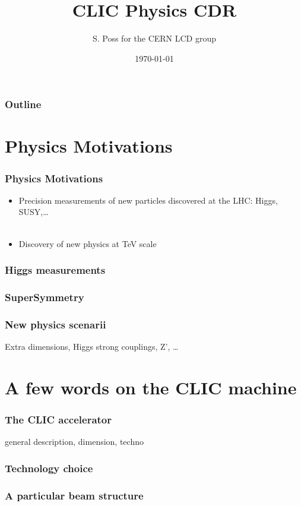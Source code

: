 \documentclass{beamer}
\author{S. Poss for the CERN LCD group}
\institute[CERN]{CERN}
\title[]{CLIC Physics CDR}
\date{\today}
\begin{document}
\begin{frame}
	\titlepage
\end{frame}

\begin{frame}
\frametitle{Outline}
\tableofcontents
\end{frame}


\section{Physics Motivations}
\begin{frame}
\frametitle{Physics Motivations}
\begin{itemize}
  \item \alert{Precision measurements} of new particles discovered at the LHC:
  Higgs, SUSY,\ldots\\
  ~\\ 
  \item \alert{Discovery} of new physics at TeV scale
\end{itemize}
\end{frame}

\begin{frame}
\frametitle{Higgs measurements}

\end{frame}

\begin{frame}
\frametitle{SuperSymmetry}

\end{frame}

\begin{frame}
\frametitle{New physics scenarii}
Extra dimensions, Higgs strong couplings, Z', \ldots
\end{frame}

\section[CLIC]{A few words on the CLIC machine}
\begin{frame}
\frametitle{The CLIC accelerator}
general description, dimension, techno
\end{frame}

\begin{frame}
\frametitle{Technology choice}
\end{frame}

\begin{frame}
\frametitle{A particular beam structure}

\end{frame}
\end{document}
